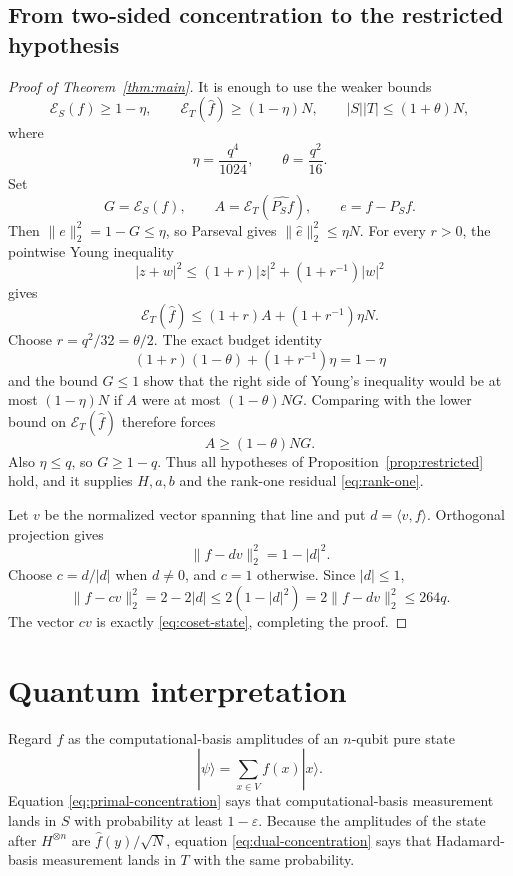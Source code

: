 \documentclass[11pt]{article}
\theoremstyle{remark}
\newcommand{\E}{\mathcal E}
\newcommand{\1}{\mathbf 1}
\begin{document}
\subsection{From two-sided concentration to the restricted hypothesis}

\begin{proof}[Proof of Theorem~\ref{thm:main}]
It is enough to use the weaker bounds
\[
  \E_S(f)\geq1-\eta,\qquad
  \E_T(\widehat f)\geq(1-\eta)N,\qquad
  |S||T|\leq(1+\theta)N,
\]
where
\[
  \eta=\frac{q^4}{1024},\qquad
  \theta=\frac{q^2}{16}.
\]
Set
\[
  G=\E_S(f),\qquad
  A=\E_T(\widehat{P_Sf}),\qquad
  e=f-P_Sf.
\]
Then $\|e\|_2^2=1-G\leq\eta$, so Parseval gives
$\|\widehat e\|_2^2\leq\eta N$. For every $r>0$, the pointwise Young
inequality
\[
 |z+w|^2\leq(1+r)|z|^2+(1+r^{-1})|w|^2
\]
gives
\[
 \E_T(\widehat f)
 \leq(1+r)A+(1+r^{-1})\eta N.
\]
Choose $r=q^2/32=\theta/2$. The exact budget identity
\[
  (1+r)(1-\theta)+(1+r^{-1})\eta=1-\eta
\]
and the bound $G\leq1$ show that the right side of Young's inequality would
be at most $(1-\eta)N$ if $A$ were at most
$(1-\theta)NG$. Comparing with the lower bound on
$\E_T(\widehat f)$ therefore forces
\[
  A\geq(1-\theta)NG.
\]
Also $\eta\leq q$, so $G\geq1-q$. Thus all hypotheses of
Proposition~\ref{prop:restricted} hold, and it supplies $H,a,b$ and the
rank-one residual \eqref{eq:rank-one}.

Let $v$ be the normalized vector spanning that line and put
$d=\langle v,f\rangle$. Orthogonal projection gives
\[
  \|f-dv\|_2^2=1-|d|^2.
\]
Choose $c=d/|d|$ when $d\neq0$, and $c=1$ otherwise. Since $|d|\leq1$,
\[
  \|f-cv\|_2^2=2-2|d|
  \leq2(1-|d|^2)
  =2\|f-dv\|_2^2
  \leq264q.
\]
The vector $cv$ is exactly \eqref{eq:coset-state}, completing the proof.
\end{proof}

\section{Quantum interpretation}\label{sec:quantum}

Regard $f$ as the computational-basis amplitudes of an $n$-qubit pure state
\[
  |\psi\rangle=\sum_{x\in V}f(x)|x\rangle.
\]
Equation \eqref{eq:primal-concentration} says that computational-basis
measurement lands in $S$ with probability at least $1-\varepsilon$.
Because the amplitudes of the state after $H^{\otimes n}$ are
$\widehat f(y)/\sqrt N$, equation \eqref{eq:dual-concentration} says that
Hadamard-basis measurement lands in $T$ with the same probability.
\end{document}
